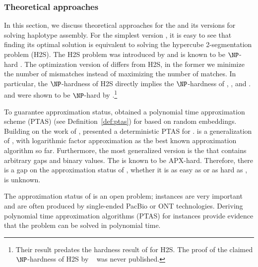 \subsubsection{Theoretical approaches}
In this section, we discuss theoretical approaches for the \MEC and its versions for solving haplotype assembly.
For the simplest version \BMEC, it is easy to see that finding its optimal solution is equivalent to solving the hypercube 2-segmentation problem (H2S).
The H2S problem was introduced by \cite{KPR98_segmentation,KPR04_segmentation} and is known to be $\NP$-hard \citep{Fei14_np,KPR04_segmentation}.
The optimization version of \BMEC  differs from H2S, in the former we minimize the number of mismatches instead of maximizing the number of matches.
In particular, the $\NP$-hardness of H2S directly implies the $\NP$-hardness of \BMEC, \GMEC, and \MEC.
\GMEC and \MEC were shown to be $\NP$-hard by \cite{Cilibrasi2007}.\footnote{Their result predates the hardness result of \cite{Fei14_np} for H2S. The proof of the claimed $\NP$-hardness of H2S by ~\cite{KPR98_segmentation} was never published.}

To guarantee approximation status, \cite{OR02_polynomial} obtained a polynomial time approximation scheme (PTAS) (see Definition~\ref{def:ptas}) for \BMEC based on random embeddings.
Building on the work of \cite{LMW02_finding}, \cite{JXL04_k} presented a deterministic PTAS for \BMEC.
\GMEC is a generalization of \BMEC, with logarithmic factor approximation as the best known approximation algorithm so far.
Furthermore, the most generalized version is the \MEC that contains arbitrary gaps and binary values. The \MEC is known to be APX-hard. 
Therefore, there is a gap on the approximation status of \GMEC,  whether it is as easy as \BMEC or as hard as \MEC, is unknown.


\begin{gaps}
 The approximation status of \GMEC is an open problem; \GMEC instances are very important and are often produced by single-ended PacBio or ONT technologies.
 Deriving polynomial time approximation algorithms (PTAS) for \GMEC instances provide evidence that the problem can be solved in polynomial time.
 \label{gap:gap1}
\end{gaps}

